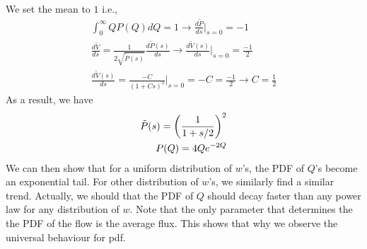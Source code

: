 %
We set the mean to $1$ i.e.,
%
\begin{align}
  \int_0^{\infty} Q P(Q) dQ = 1 \to \frac{d\tilde{P}}{ds}|_{s=0}  = -1\\
  \frac{d \tilde{V}}{ds}  = \frac{1}{2 \sqrt{\tilde{P}(s)}} \frac{d \tilde{P}(s)}{d s}   \to \frac{d\tilde{V}(s)}{ds}|_{s=0} =\frac{-1}{2} \\
  \frac{d\tilde{V}(s)}{ds} = \frac{-C}{(1+Cs)^{2}}|_{s=0} = -C = \frac{-1}{2}  \to C=\frac{1}{2} 
\end{align}
%
As a result, we have
%
\begin{align}
  \tilde{P}(s) = \left(\frac{1}{1+s/2} \right)^2 \\
  P(Q) = 4Q e^{-2Q}
\end{align}
%
We can then show that for a uniform distribution of $w$'s, the PDF of
$Q$'s become an exponential tail. For other distribution of $w$'s, we
similarly find a similar trend. Actually, we should that the PDF of
$Q$ should decay faster than any power law for any distribution of
$w$. Note that the only parameter that determines the the PDF of the
flow is the average flux. This shows that why we observe the universal
behaviour for pdf.



